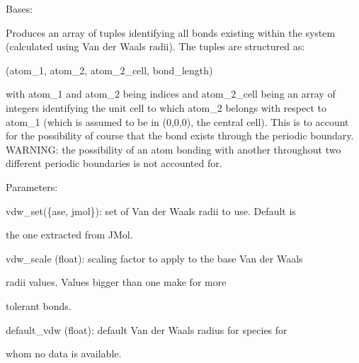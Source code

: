 \documentclass[letterpaper,10pt,english]{sphinxmanual}
\begin{document}
\begin{fulllineitems}
\label{doctree/soprano.properties.linkage.linkage:soprano.properties.linkage.linkage.Bonds}
Bases: {\hyperref[doctree/soprano.properties.atomsproperty:soprano.properties.atomsproperty.AtomsProperty]{}}

Produces an array of tuples identifying all bonds existing within the
system (calculated using Van der Waals radii). The tuples are structured
as:

(atom\_1, atom\_2, atom\_2\_cell, bond\_length)

with atom\_1 and atom\_2 being indices and atom\_2\_cell being an array of
integers identifying the unit cell to which atom\_2 belongs with respect
to atom\_1 (which is assumed to be in (0,0,0), the central cell). This is
to account for the possibility of course that the bond exists through the
periodic boundary. WARNING: the possibility of an atom bonding with
another throughout two different periodic boundaries is not accounted for.

\begin{DUlineblock}{0em}
\item[] Parameters:
\item[]
\begin{DUlineblock}{\DUlineblockindent}
\item[] vdw\_set(\{ase, jmol\}): set of Van der Waals radii to use. Default is
\item[]
\begin{DUlineblock}{\DUlineblockindent}
\item[] the one extracted from JMol.
\end{DUlineblock}
\item[] vdw\_scale (float): scaling factor to apply to the base Van der Waals
\item[]
\begin{DUlineblock}{\DUlineblockindent}
\item[] radii values. Values bigger than one make for more
\item[] tolerant bonds.
\end{DUlineblock}
\item[] default\_vdw (float): default Van der Waals radius for species for
\item[]
\begin{DUlineblock}{\DUlineblockindent}
\item[] whom no data is available.
\end{DUlineblock}
\end{DUlineblock}
\end{DUlineblock}


\end{fulllineitems}
\end{document}
